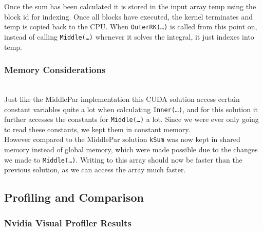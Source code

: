 Once the sum has been calculated it is stored in the input array temp using the block id for indexing. Once all blocks have executed, the kernel terminates and temp is copied back to the CPU. When \texttt{OuterRK(…)} is called from this point on, instead of calling \texttt{Middle(…)} whenever it solves the integral, it just indexes into temp.

\subsubsection{Memory Considerations} \hfill \\
Just like the MiddlePar implementation this CUDA solution access certain constant variables quite a lot when calculating \texttt{Inner(…)}, and for this solution it further accesses the constants for \texttt{Middle(…)} a lot. Since we were ever only going to read these constants, we kept them in constant memory.\\

However compared to the MiddlePar solution \texttt{kSum} was now kept in shared memory instead of global memory, which were made possible due to the changes we made to \texttt{Middle(…)}. Writing to this array should now be faster than the previous solution, as we can access the array much faster.

\subsection{Profiling and Comparison}
\subsubsection{Nvidia Visual Profiler Results} \hfill \\

